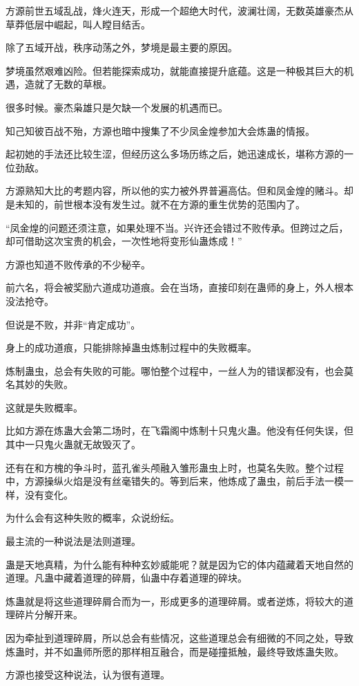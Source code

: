 \begin{this_body}
方源前世五域乱战，烽火连天，形成一个超绝大时代，波澜壮阔，无数英雄豪杰从草莽低层中崛起，叫人瞠目结舌。

除了五域开战，秩序动荡之外，梦境是最主要的原因。

梦境虽然艰难凶险。但若能探索成功，就能直接提升底蕴。这是一种极其巨大的机遇，造就了无数的草根。

很多时候。豪杰枭雄只是欠缺一个发展的机遇而已。

知己知彼百战不殆，方源也暗中搜集了不少凤金煌参加大会炼蛊的情报。

起初她的手法还比较生涩，但经历这么多场历练之后，她迅速成长，堪称方源的一位劲敌。

方源熟知大比的考题内容，所以他的实力被外界普遍高估。但和凤金煌的赌斗。却是未知的，前世根本没有发生过。就不在方源的重生优势的范围内了。

“凤金煌的问题还须注意，如果处理不当。兴许还会错过不败传承。但跨过之后，却可借助这次宝贵的机会，一次性地将变形仙蛊炼成！”

方源也知道不败传承的不少秘辛。

前六名，将会被奖励六道成功道痕。会在当场，直接印刻在蛊师的身上，外人根本没法抢夺。

但说是不败，并非“肯定成功”。

身上的成功道痕，只能排除掉蛊虫炼制过程中的失败概率。

炼制蛊虫，总会有失败的可能。哪怕整个过程中，一丝人为的错误都没有，也会莫名其妙的失败。

这就是失败概率。

比如方源在炼蛊大会第二场时，在飞霜阁中炼制十只鬼火蛊。他没有任何失误，但其中一只鬼火蛊就无故毁灭了。

还有在和方槐的争斗时，蓝孔雀头颅融入雏形蛊虫上时，也莫名失败。整个过程中，方源操纵火焰是没有丝毫错失的。等到后来，他炼成了蛊虫，前后手法一模一样，没有变化。

为什么会有这种失败的概率，众说纷纭。

最主流的一种说法是法则道理。

蛊是天地真精，为什么能有种种玄妙威能呢？就是因为它的体内蕴藏着天地自然的道理。凡蛊中藏着道理的碎屑，仙蛊中存着道理的碎块。

炼蛊就是将这些道理碎屑合而为一，形成更多的道理碎屑。或者逆炼，将较大的道理碎片分解开来。

因为牵扯到道理碎屑，所以总会有些情况，这些道理总会有细微的不同之处，导致炼蛊时，并不如蛊师所愿的那样相互融合，而是碰撞抵触，最终导致炼蛊失败。

方源也接受这种说法，认为很有道理。


\end{this_body}
